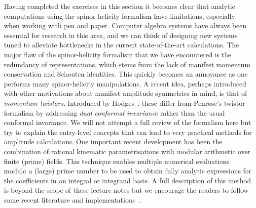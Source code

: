 Having completed the exercises in this section it becomes clear that analytic
computations using the spinor-helicity formalism have limitations, especially
when working with pen and paper. Computer algebra systems have always been
essential for research in this area, and we can think of designing new systems
tuned to alleviate bottlenecks in the current state-of-the-art calculations.
The major flaw of the spinor-helicity formalism that we have encountered is the
redundancy of representations, which stems from the lack of manifest momentum
conservation and Schouten identities. This quickly becomes an annoyance as one
performs many spinor-helicity manipulations. A recent idea, perhaps introduced
with other motivations about manifest amplitude symmetries in mind, is that of
\emph{momentum twistors}. Introduced by Hodges~\cite{ch3_Hodges:2009hk}, these
differ from Penrose's twistor formalism by addressing \textit{dual conformal
invariance} rather than the usual conformal invariance. We will not attempt a
full review of the formalism here but try to explain the entry-level concepts
that can lead to very practical methods for amplitude calculations. One
important recent development has been the combination of rational kinematic
parametrisations with modular arithmetic over finite (prime) fields. This
technique enables multiple numerical evaluations modulo a (large) prime number
to be used to obtain fully analytic expressions for the coefficients in an
integral or integrand basis. A full description of this method is beyond the
scope of these lecture notes but we encourage the readers to follow some recent literature
and implementations~\cite{ch3_Peraro:2016wsq,ch3_Peraro:2019svx}.

